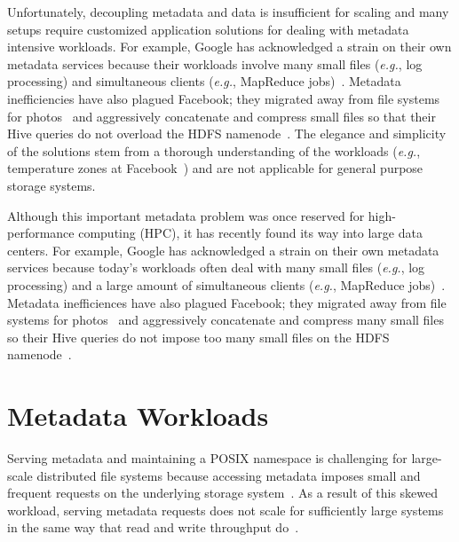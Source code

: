 Unfortunately, decoupling metadata and data is insufficient for scaling and
many setups require customized application solutions for dealing with metadata
intensive workloads. For example, Google has acknowledged a strain on their own
metadata services because their workloads involve many small files ({\it e.g.},
log processing) and simultaneous clients ({\it e.g.}, MapReduce
jobs)~\cite{mckusick:acm2010-gfs-evolution}. Metadata inefficiencies have also
plagued Facebook; they migrated away from file systems for
photos~\cite{beaver:osdi2010-haystack} and aggressively concatenate and
compress small files so that their Hive queries do not overload the HDFS
namenode~\cite{thusoo:sigmod2010-facebook-infrastructure}. The elegance and
simplicity of the solutions stem from a thorough understanding of the workloads
({\it e.g.}, temperature zones at Facebook~\cite{muralidhar:osdi2014-f4}) and
are not applicable for general purpose storage systems. 



Although this important metadata problem was once reserved for high-performance
computing (HPC), it has recently found its way into large data centers. For
example, Google has acknowledged a strain on their own metadata services
because today's workloads often deal with many small files ({\it e.g.}, log
processing) and a large amount of simultaneous clients ({\it e.g.}, MapReduce
jobs)~\cite{mckusick:acm2010-gfs-evolution}. Metadata inefficiences have also
plagued Facebook; they migrated away from file systems for
photos~\cite{beaver:osdi2010-haystack} and aggressively concatenate and
compress many small files so their Hive queries do not impose too many small
files on the HDFS namenode~\cite{thusoo:sigmod2010-facebook-infrastructure}. 

\section{Metadata Workloads}
Serving metadata and maintaining a POSIX namespace is challenging for
large-scale distributed file systems because accessing metadata imposes small
and frequent requests on the underlying storage
system~\cite{roselli:atec2000-FS-workloads}. As a result of this skewed
workload, serving metadata requests does not scale for sufficiently large
systems in the same way that read and write throughput
do~\cite{abad:ucc2012-mimesis, alam:pdsw2011-metadata-scaling,
weil:osdi2006-ceph}. 

